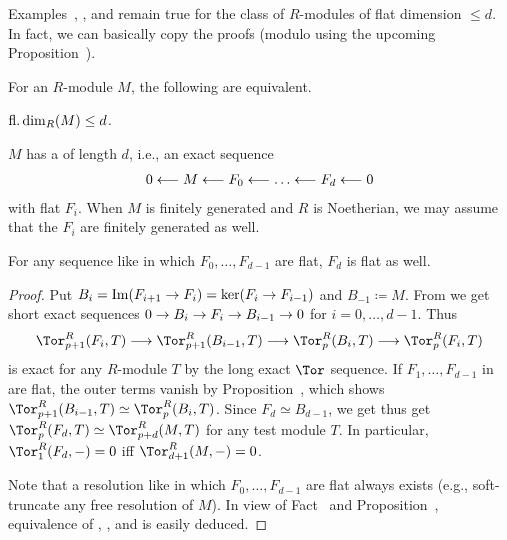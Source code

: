 \documentclass[a4paper,parskip=half,numbers=enddot, DIV=12]{scrreprt}
\begin{document}
\begin{rem*}
	Examples~, , and  remain true for the class of $R$-modules of flat dimension $\leq d$. In fact, we can basically copy the proofs (modulo using the upcoming Proposition~).
\end{rem*}
\begin{prop}
	For an $R$-module $M$, the following are equivalent.
	\begin{alphanumerate}
		\item $\operatorname{fl.dim}_R(M)\leq d$.
		\item $M$ has a  of length $d$, i.e., an exact sequence
		\begin{align}\lbl{eq:flatResolution}
			0\lmorphism M\lmorphism F_0\lmorphism \ldots\lmorphism F_d\lmorphism 0
		\end{align}
		with flat $F_i$. When $M$ is finitely generated and $R$ is Noetherian, we may assume that the $F_i$ are finitely generated as well.
		\item For any sequence like  in which $F_0,\ldots,F_{d-1}$ are flat, $F_d$ is flat as well.
	\end{alphanumerate}
\end{prop}
\begin{proof}
	Put $B_i=\Im(F_{i+1}\morphism F_i)=\ker(F_i\morphism F_{i-1})$ and $B_{-1}\coloneqq M$. From  we get short exact sequences $0\morphism B_i\morphism F_i\morphism B_{i-1}\morphism 0$ for $i=0,\ldots,d-1$. Thus
	\begin{align*}
		\Tor_{p+1}^R(F_i,T)\morphism \Tor_{p+1}^R(B_{i-1},T)\morphism \Tor_p^R(B_i,T)\morphism\Tor_p^R(F_i,T)
	\end{align*}
	is exact for any $R$-module $T$ by the long exact $\Tor$ sequence. If $F_1,\ldots,F_{d-1}$ in  are flat, the outer terms vanish by Proposition~, which shows $\Tor_{p+1}^R(B_{i-1},T)\simeq \Tor_p^R(B_i,T)$. Since $F_d\simeq B_{d-1}$, we get thus get $\Tor_p^R(F_d,T)\simeq \Tor_{p+d}^R(M,T)$ for any test module $T$. In particular, $\Tor_1^R(F_d,-)=0$ iff $\Tor_{d+1}^R(M,-)=0$.
	
	Note that a resolution like  in which $F_0,\ldots,F_{d-1}$ are flat always exists (e.g., soft-truncate any free resolution of $M$). In view of Fact~ and Proposition~, equivalence of , , and  is easily deduced.
\end{proof}
\end{document}
